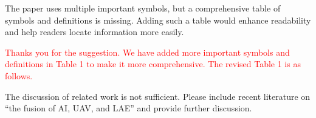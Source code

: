 \begin{revcomment}
	The paper uses multiple important symbols, but a comprehensive table of symbols and definitions is missing. Adding such a table would enhance readability and help readers locate information more easily.
\end{revcomment}
\begin{revresponse}
	\textcolor{red}{
	Thanks you for the suggestion. We have added more important symbols and definitions in Table 1 to make it more comprehensive. The revised Table 1 is as follows.
	}
	\begin{changes}
	\end{changes}
\end{revresponse}

\begin{revcomment}
	The discussion of related work is not sufficient. Please include recent literature on ``the fusion of AI, UAV, and LAE'' and provide further discussion.
\end{revcomment}
\begin{revresponse}
\end{revresponse}

